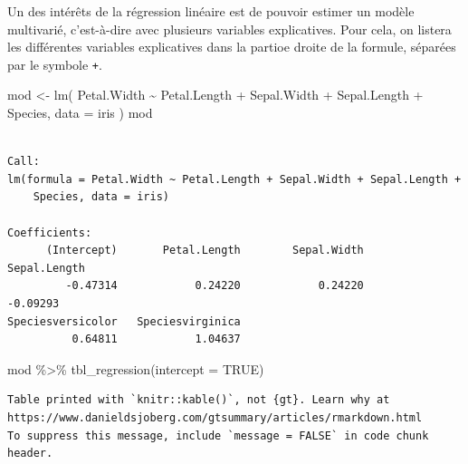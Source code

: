 \documentclass[
  letterpaper,
  DIV=11,
  numbers=noendperiod,
  oneside]{scrreprt}
\newenvironment{Shaded}{\begin{snugshade}}{\end{snugshade}}
\newcommand{\AttributeTok}[1]{\textcolor[rgb]{0.40,0.45,0.13}{#1}}
\newcommand{\ConstantTok}[1]{\textcolor[rgb]{0.56,0.35,0.01}{#1}}
\newcommand{\FunctionTok}[1]{\textcolor[rgb]{0.28,0.35,0.67}{#1}}
\newcommand{\NormalTok}[1]{\textcolor[rgb]{0.00,0.23,0.31}{#1}}
\newcommand{\OtherTok}[1]{\textcolor[rgb]{0.00,0.23,0.31}{#1}}
\newcommand{\SpecialCharTok}[1]{\textcolor[rgb]{0.37,0.37,0.37}{#1}}
\begin{document}
Un des intérêts de la régression linéaire est de pouvoir estimer un
modèle multivarié, c'est-à-dire avec plusieurs variables explicatives.
Pour cela, on listera les différentes variables explicatives dans la
partioe droite de la formule, séparées par le symbole \texttt{+}.

\begin{Shaded}
\begin{Highlighting}[]
\NormalTok{mod }\OtherTok{\textless{}{-}} \FunctionTok{lm}\NormalTok{(}
\NormalTok{  Petal.Width }\SpecialCharTok{\textasciitilde{}}\NormalTok{ Petal.Length }\SpecialCharTok{+}\NormalTok{ Sepal.Width }\SpecialCharTok{+}\NormalTok{ Sepal.Length }\SpecialCharTok{+}\NormalTok{ Species,}
  \AttributeTok{data =}\NormalTok{ iris}
\NormalTok{)}
\NormalTok{mod}
\end{Highlighting}
\end{Shaded}

\begin{verbatim}

Call:
lm(formula = Petal.Width ~ Petal.Length + Sepal.Width + Sepal.Length + 
    Species, data = iris)

Coefficients:
      (Intercept)       Petal.Length        Sepal.Width       Sepal.Length  
         -0.47314            0.24220            0.24220           -0.09293  
Speciesversicolor   Speciesvirginica  
          0.64811            1.04637  
\end{verbatim}

\begin{Shaded}
\begin{Highlighting}[]
\NormalTok{mod }\SpecialCharTok{\%\textgreater{}\%}
  \FunctionTok{tbl\_regression}\NormalTok{(}\AttributeTok{intercept =} \ConstantTok{TRUE}\NormalTok{)}
\end{Highlighting}
\end{Shaded}

\begin{verbatim}
Table printed with `knitr::kable()`, not {gt}. Learn why at
https://www.danieldsjoberg.com/gtsummary/articles/rmarkdown.html
To suppress this message, include `message = FALSE` in code chunk header.
\end{verbatim}
\end{document}
